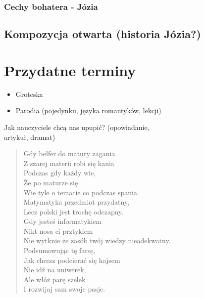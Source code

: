\documentclass[a4paper]{article}
\begin{document}
\subsubsection{Cechy bohatera - Józia}
\subsection{Kompozycja otwarta (historia Józia?)}
\section{Przydatne terminy}
\begin{itemize}
    \item Groteska
    \item Parodia (pojedynku, języka romantyków, lekcji)
\end{itemize}
 Jak nauczyciele chcą nas upupić? (opowiadanie,\\ artykuł, dramat)
\begin{quotation}
Gdy belfer do matury zagania \\
Z szarej materii robi się kania \\
Podczas gdy każdy wie, \\
Że po maturze się \\
Wie tyle o temacie co podczas spania. \\
Matymatyka przedmiot przydatny, \\
Lecz polski jest trochę odczapny. \\
Gdy jesteś informatykiem \\
Nikt nosa ci prztykiem \\
Nie wytknie że zasób twój wiedzy nieadekwatny. \\
Podsumowując tę farsę, \\
Jak chcesz podcierać się hajsem \\
Nie idź na uniwerek, \\
Ale włóż parę szelek \\
I rozwijaj sam swoje pasje.
\end{quotation}
\end{document}

